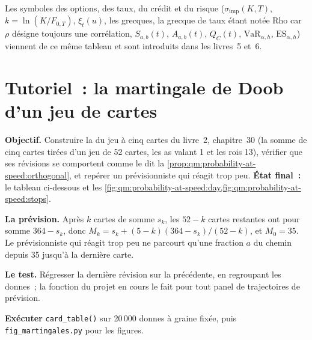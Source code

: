 Les symboles des options, des taux, du crédit et du risque ($\sigma_{\mathrm{imp}}(K,T)$, $k = \ln(K/F_{0,T})$,
$\xi_t(u)$, les grecques, la grecque de taux étant notée Rho car $\rho$ désigne toujours une corrélation,
$S_{a,b}(t)$, $A_{a,b}(t)$, $Q_C(t)$, $\mathrm{VaR}_{\alpha,h}$, $\mathrm{ES}_{\alpha,h}$) viennent
de ce même tableau et sont introduits dans les livres~5 et~6.

\section{Tutoriel~: la martingale de Doob d'un jeu de cartes}\label{tut:qm:probability-at-speed:cards}

\begin{tutorial}
\textbf{Objectif.} Construire la  du jeu à cinq cartes du livre~2,
chapitre~30 (la somme de cinq cartes tirées d'un jeu de 52 cartes, les as valant 1 et les rois 13), vérifier que
ses révisions se comportent comme le dit la \cref{prop:qm:probability-at-speed:orthogonal}, et repérer un
prévisionniste qui réagit trop peu. \textbf{État final~:} le tableau ci-dessous et
les \cref{fig:qm:probability-at-speed:day,fig:qm:probability-at-speed:stops}.
\begin{tutsteps}
\item \textbf{La prévision.} Après $k$ cartes de somme $s_k$, les $52 - k$ cartes restantes
ont pour somme $364 - s_k$, donc $M_k = s_k + (5 - k)(364 - s_k)/(52 - k)$, et $M_0 = 35$. Le
prévisionniste qui réagit trop peu ne parcourt qu'une fraction $a$ du chemin depuis 35 jusqu'à la dernière carte.
\label{lst:qm:probability-at-speed:cards}
\item \textbf{Le test.} Régresser la dernière révision sur la précédente, en regroupant les donnes~;
la fonction du projet en cours le fait pour tout panel de trajectoires de prévision.
\label{lst:qm:probability-at-speed:regression}
\item \textbf{Exécuter} \texttt{card\_table()} sur 20\,000 donnes à graine fixée, puis
\texttt{fig\_martingales.py} pour les figures.
\end{tutsteps}
\begin{center}
\small
\begin{tabular}{@{}lcc@{}}

\end{tabular}
\end{center}
\end{tutorial}
